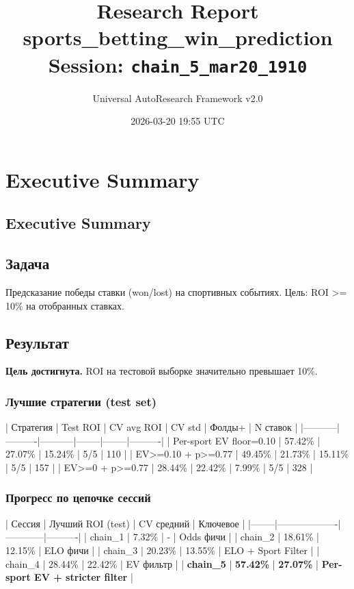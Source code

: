 \documentclass[12pt,a4paper]{article}
\title{
    \Large\textbf{Research Report}\\[0.5em]
    \large sports\_betting\_win\_prediction\\[0.3em]
    \normalsize Session: \texttt{chain\_5\_mar20\_1910}
}
\author{Universal AutoResearch Framework v2.0}
\date{2026-03-20 19:55 UTC}
\begin{document}
\maketitle
\tableofcontents
\newpage


\section{Executive Summary}

\subsection{Executive Summary}

\subsection{Задача}
Предсказание победы ставки (won/lost) на спортивных событиях. Цель: ROI >= 10\% на отобранных ставках.

\subsection{Результат}
\textbf{Цель достигнута.} ROI на тестовой выборке значительно превышает 10\%.

\subsubsection{Лучшие стратегии (test set)}
| Стратегия | Test ROI | CV avg ROI | CV std | Фолды+ | N ставок |
|-----------|----------|-----------|--------|--------|----------|
| Per-sport EV floor=0.10 | 57.42\% | 27.07\% | 15.24\% | 5/5 | 110 |
| EV>=0.10 + p>=0.77 | 49.45\% | 21.73\% | 15.11\% | 5/5 | 157 |
| EV>=0 + p>=0.77 | 28.44\% | 22.42\% | 7.99\% | 5/5 | 328 |

\subsubsection{Прогресс по цепочке сессий}
| Сессия | Лучший ROI (test) | CV средний | Ключевое |
|--------|-------------------|------------|----------|
| chain\_1 | 7.32\% | - | Odds фичи |
| chain\_2 | 18.61\% | 12.15\% | ELO фичи |
| chain\_3 | 20.23\% | 13.55\% | ELO + Sport Filter |
| chain\_4 | 28.44\% | 22.42\% | EV фильтр |
| \textbf{chain\_5} | \textbf{57.42\%} | \textbf{27.07\%} | \textbf{Per-sport EV + stricter filter} |
\end{document}
